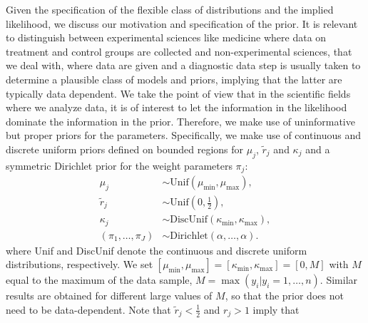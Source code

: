 \documentclass[11pt]{article}
\begin{document}


Given the specification of the flexible class of distributions and the implied likelihood, we discuss our motivation and specification of the prior. It is relevant to distinguish between experimental sciences like medicine where data on treatment and control groups are collected and non-experimental sciences, that we deal with, where data are given and a diagnostic data step is usually taken to determine a plausible class of models and priors, implying that the latter are typically data dependent. We take the point of view that in the scientific fields where we analyze data, it is of interest to let the information in the likelihood dominate the information in the prior. Therefore, we make use of uninformative but proper priors for the parameters. Specifically, we make use of continuous and discrete
uniform priors defined on bounded regions for $\mu_j$, $\tilde r_j$ and $\kappa_j$ and a symmetric Dirichlet prior for the weight parameters $\pi_j$:
%
\begin{align}
	\label{eq:mixtureNBPrior1}
   \mu_j&\sim \mbox{Unif}(\mu_{\min},\mu_{\max}), \\
    \label{eq:mixtureNBPrior2}
   \tilde r_j&\sim \mbox{Unif} \left(0,\frac{1}{2} \right), \\
	\label{eq:mixtureNBPrior3}
   \kappa_j&\sim \mbox{DiscUnif}(\kappa_{\min},\kappa_{\max}), \\
	\label{eq:mixtureNBPrior4}
   (\pi_1,\ldots,\pi_J) &\sim \mbox{Dirichlet}(\alpha,\ldots,\alpha).
 \end{align}
where Unif and DiscUnif denote the continuous and discrete uniform distributions,
respectively.
We set $[\mu_{\min},\mu_{\max}] = [\kappa_{\min},\kappa_{\max}] = [0,M]$
with $M$ equal to the maximum of the data sample, $M = \max(y_i |y_i=1,\ldots,n)$.
Similar results are obtained for different large values of $M$, so that the prior does not need to be data-dependent. Note that $\tilde r_j < \frac{1}{2}$ and $r_j>1$ imply that 
\end{document}
